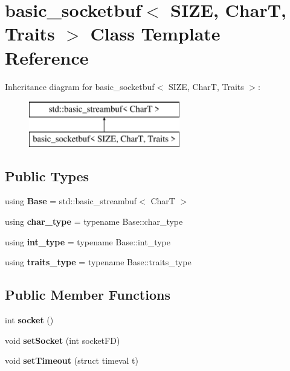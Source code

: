 \section{basic\+\_\+socketbuf$<$ S\+I\+ZE, CharT, Traits $>$ Class Template Reference}
\label{classbasic__socketbuf}
Inheritance diagram for basic\+\_\+socketbuf$<$ S\+I\+ZE, CharT, Traits $>$\+:\begin{figure}[H]
\begin{center}
\leavevmode
\includegraphics[height=2.000000cm]{classbasic__socketbuf}
\end{center}
\end{figure}
\subsection*{Public Types}
\begin{DoxyCompactItemize}
\item 
\mbox{\label{classbasic__socketbuf_a5257f37280d2a2b454c7a104b644ab18}} 
using {\bfseries Base} = std\+::basic\+\_\+streambuf$<$ CharT $>$
\item 
\mbox{\label{classbasic__socketbuf_a1ebf06a9987bf4438169b90a4e56c27a}} 
using {\bfseries char\+\_\+type} = typename Base\+::char\+\_\+type
\item 
\mbox{\label{classbasic__socketbuf_a61723e7961ab74aa950f74f7f67afe19}} 
using {\bfseries int\+\_\+type} = typename Base\+::int\+\_\+type
\item 
\mbox{\label{classbasic__socketbuf_a61c3a8165d2df95df43e9f66c92687a4}} 
using {\bfseries traits\+\_\+type} = typename Base\+::traits\+\_\+type
\end{DoxyCompactItemize}
\subsection*{Public Member Functions}
\begin{DoxyCompactItemize}
\item 
\mbox{\label{classbasic__socketbuf_acd14ae88bcf245e74cc2fef11df6a10f}} 
int {\bfseries socket} ()
\item 
\mbox{\label{classbasic__socketbuf_a155a8afbba17c7c4cde6f49d1c959b1a}} 
void {\bfseries set\+Socket} (int socket\+FD)
\item 
\mbox{\label{classbasic__socketbuf_a4b35911c6e2f02ac7752fdcf8efb9918}} 
void {\bfseries set\+Timeout} (struct timeval t)
\end{DoxyCompactItemize}
